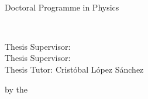 \documentclass[../main.tex]{subfiles}
\begin{document}
\begin{titlepage}
\begin{addmargin}[-1cm]{-3cm}
\begin{minipage}[c][0.2\textheight]{0.5\textwidth}
        \end{minipage}
        \hfill

        \begin{center}
            \vspace*{.1\textheight}
        
             \\
            \myYear
        
            \bigskip

            Doctoral Programme in Physics \\

            \vfill
        
            \begingroup
                \spacedallcaps{\myTitle}
                \\ \smallskip
                \textsc{\MakeLowercase{\mySubtitle}}
            \endgroup

            \bigskip
            
            \myName

            
            \vfill

            \begin{flushleft}
                Thesis Supervisor: \mySupervisor \\
                Thesis Supervisor: \myOtherSupervisor \\
                Thesis Tutor: Cristóbal López Sánchez\\

                \vfill

                \myDegree by the \myUni
            \end{flushleft}
        
        \end{center}
    \end{addmargin}
\end{titlepage}
\end{document}
